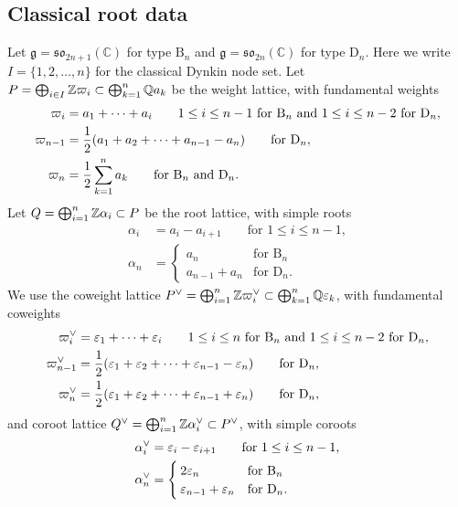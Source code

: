 \documentclass[a4paper]{amsart}
\theoremstyle{remark}
\numberwithin{equation}{section}
\begin{document}
\subsection{Classical root data}
\label{SS:root data}
Let $\mathfrak{g} = \mathfrak{so}_{2n+1}(\mathbb{C})$ for type $\mathrm{B}_n$ and
$\mathfrak{g}=\mathfrak{so}_{2n}(\mathbb{C})$ for type $\mathrm{D}_n$. Here we write $I=\{1,2,\dots,n\}$ for the classical Dynkin node set. Let $P = \bigoplus_{i\in I} \mathbb{Z} \varpi_i\subset \bigoplus_{k=1}^n \mathbb{Q} a_k$ be the weight lattice, with fundamental weights
\begin{align*}
  \varpi_i &= a_1 + \dotsm + a_i\qquad\text{$1\le i\le n-1$ for $\mathrm{B}_n$ and $1\le i\le n-2$ for $\mathrm{D}_n$}, \\
  \varpi_{n-1} &= \frac{1}{2}(a_1+a_2+\dotsm+a_{n-1}-a_n) \qquad\text{for $\mathrm{D}_n$}, \\
  \varpi_n &= \frac{1}{2}\sum_{k=1}^n a_k \qquad\text{for $\mathrm{B}_n$ and $\mathrm{D}_n$}.
\end{align*}
Let $Q =\bigoplus_{i=1}^n \mathbb{Z} \alpha_i \subset P$ be the root lattice, with simple roots 
\begin{align}
\label{E:simple A root}
  \alpha_i &= a_i - a_{i+1} \qquad\text{for $1\le i\le n-1$}, \\
\label{E:simple BD n root}
  \alpha_n &= \begin{cases}
      a_n & \text{for $\mathrm{B}_n$} \\
      a_{n-1}+a_n &\text{for $\mathrm{D}_n$.}
  \end{cases}
\end{align}
We use the coweight lattice $P^\lor=\bigoplus_{i=1}^n \mathbb{Z} \varpi_i^\lor \subset \bigoplus_{k=1}^n \mathbb{Q} \varepsilon_k$, with
fundamental coweights 
\begin{align*}
  \varpi_i^\lor &= \varepsilon_1 + \dotsm + \varepsilon_i\qquad\text{$1\leq i\le n$ for $\mathrm{B}_n$ and $1\leq i\le n-2$ for $\mathrm{D}_n$}, \\
  \varpi_{n-1}^\lor &= \frac{1}{2}(\varepsilon_1+\varepsilon_2+\dotsm+\varepsilon_{n-1}-\varepsilon_n)\qquad\text{for $\mathrm{D}_n$}, \\
\varpi_{n}^\lor &= \frac{1}{2}(\varepsilon_1+\varepsilon_2+\dotsm+\varepsilon_{n-1}+\varepsilon_n)\qquad\text{for $\mathrm{D}_n$},
\end{align*}
and coroot lattice $Q^\lor =\bigoplus_{i=1}^n \mathbb{Z} \alpha_i^\lor \subset P^\lor$, with simple coroots
\begin{align}
\label{E:simple A coroot}
  \alpha_i^\lor &= \varepsilon_i - \varepsilon_{i+1} \qquad\text{for $1\le i\le n-1$}, \\
\label{E:simple BD n coroot}
  \alpha_n^\lor &= \begin{cases}
      2\varepsilon_n & \text{for $\mathrm{B}_{n}$} \\
      \varepsilon_{n-1}+\varepsilon_n &\text{for $\mathrm{D}_{n}$.}
  \end{cases}
\end{align}
\end{document}

